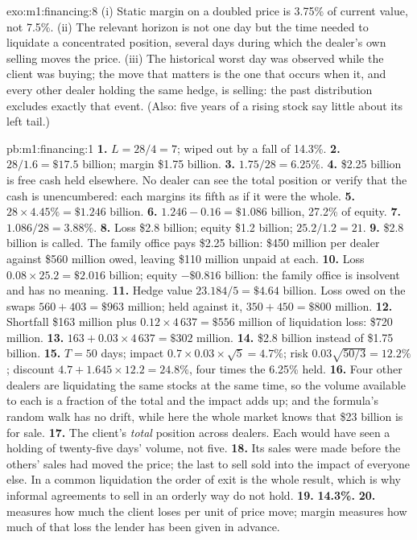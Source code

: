 \begin{solution}{exo:m1:financing:8}
(i) Static margin on a doubled price is 3.75\% of current value, not 7.5\%.
(ii) The relevant horizon is not one day but the time needed to liquidate a
concentrated position, several days during which the dealer's own selling
moves the price. (iii) The historical worst day was observed while the
client was buying; the move that matters is the one that occurs when it, and
every other dealer holding the same hedge, is selling: the past distribution
excludes exactly that event. (Also: five years of a rising stock say little
about its left tail.)
\end{solution}

\begin{solution}{pb:m1:financing:1}
\textbf{1.} $L = 28/4 = 7$; wiped out by a fall of 14.3\%.
\textbf{2.} $28/1.6 = \$17.5$ billion; margin \$1.75 billion.
\textbf{3.} $1.75/28 = 6.25\%$.
\textbf{4.} \$2.25 billion is free cash held elsewhere. No dealer can see the
total position or verify that the cash is unencumbered: each margins its
fifth as if it were the whole.
\textbf{5.} $28 \times 4.45\% = \$1.246$ billion.
\textbf{6.} $1.246 - 0.16 = \$1.086$ billion, 27.2\% of equity.
\textbf{7.} $1.086/28 = 3.88\%$.
\textbf{8.} Loss \$2.8 billion; equity \$1.2 billion;  $25.2/1.2 =
21$.
\textbf{9.} \$2.8 billion is called. The family office pays \$2.25 billion:
\$450 million per dealer against \$560 million owed, leaving \$110 million
unpaid at each.
\textbf{10.} Loss $0.08 \times 25.2 = \$2.016$ billion; equity $-\$0.816$
billion: the family office is insolvent and  has no meaning.
\textbf{11.} Hedge value $23.184/5 = \$4.64$ billion. Loss owed on the swaps
$560 + 403 = \$963$ million; held against it, $350 + 450 = \$800$ million.
\textbf{12.} Shortfall \$163 million plus $0.12 \times 4\,637 = \$556$
million of liquidation loss: \$720 million.
\textbf{13.} $163 + 0.03 \times 4\,637 = \$302$ million.
\textbf{14.} \$2.8 billion instead of \$1.75 billion.
\textbf{15.} $T = 50$ days; impact $0.7\times0.03\times\sqrt5 = 4.7\%$; risk
$0.03\sqrt{50/3} = 12.2\%$; discount $4.7 + 1.645\times12.2 = 24.8\%$, four
times the 6.25\% held.
\textbf{16.} Four other dealers are liquidating the same stocks at the same
time, so the volume available to each is a fraction of the total and the
impact adds up; and the formula's random walk has no drift, while here the
whole market knows that \$23 billion is for sale.
\textbf{17.} The client's \emph{total} position across dealers. Each would
have seen a holding of twenty-five days' volume, not five.
\textbf{18.} Its sales were made before the others' sales had moved the
price; the last to sell sold into the impact of everyone else. In a common
liquidation the order of exit is the whole result, which is why informal
agreements to sell in an orderly way do not hold.
\textbf{19.} \textbf{14.3\%.}
\textbf{20.}  measures how much the client loses per unit of price
move; margin measures how much of that loss the lender has been given in
advance.
\end{solution}

